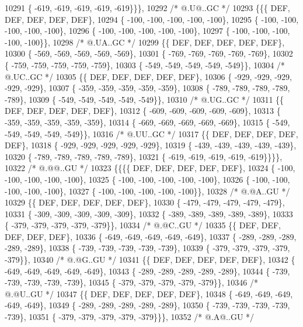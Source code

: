 \begin{DoxyCode}
10291 \{ -619, -619, -619, -619, -619\}\}\},
10292 \textcolor{comment}{/*  @.U@..GC */}
10293 \{\{\{  DEF,  DEF,  DEF,  DEF,  DEF\},
10294 \{ -100, -100, -100, -100, -100\},
10295 \{ -100, -100, -100, -100, -100\},
10296 \{ -100, -100, -100, -100, -100\},
10297 \{ -100, -100, -100, -100, -100\}\},
10298 \textcolor{comment}{/*  @.UA..GC */}
10299 \{\{  DEF,  DEF,  DEF,  DEF,  DEF\},
10300 \{ -569, -569, -569, -569, -569\},
10301 \{ -769, -769, -769, -769, -769\},
10302 \{ -759, -759, -759, -759, -759\},
10303 \{ -549, -549, -549, -549, -549\}\},
10304 \textcolor{comment}{/*  @.UC..GC */}
10305 \{\{  DEF,  DEF,  DEF,  DEF,  DEF\},
10306 \{ -929, -929, -929, -929, -929\},
10307 \{ -359, -359, -359, -359, -359\},
10308 \{ -789, -789, -789, -789, -789\},
10309 \{ -549, -549, -549, -549, -549\}\},
10310 \textcolor{comment}{/*  @.UG..GC */}
10311 \{\{  DEF,  DEF,  DEF,  DEF,  DEF\},
10312 \{ -609, -609, -609, -609, -609\},
10313 \{ -359, -359, -359, -359, -359\},
10314 \{ -669, -669, -669, -669, -669\},
10315 \{ -549, -549, -549, -549, -549\}\},
10316 \textcolor{comment}{/*  @.UU..GC */}
10317 \{\{  DEF,  DEF,  DEF,  DEF,  DEF\},
10318 \{ -929, -929, -929, -929, -929\},
10319 \{ -439, -439, -439, -439, -439\},
10320 \{ -789, -789, -789, -789, -789\},
10321 \{ -619, -619, -619, -619, -619\}\}\}\},
10322 \textcolor{comment}{/*  @.@@..GU */}
10323 \{\{\{\{  DEF,  DEF,  DEF,  DEF,  DEF\},
10324 \{ -100, -100, -100, -100, -100\},
10325 \{ -100, -100, -100, -100, -100\},
10326 \{ -100, -100, -100, -100, -100\},
10327 \{ -100, -100, -100, -100, -100\}\},
10328 \textcolor{comment}{/*  @.@A..GU */}
10329 \{\{  DEF,  DEF,  DEF,  DEF,  DEF\},
10330 \{ -479, -479, -479, -479, -479\},
10331 \{ -309, -309, -309, -309, -309\},
10332 \{ -389, -389, -389, -389, -389\},
10333 \{ -379, -379, -379, -379, -379\}\},
10334 \textcolor{comment}{/*  @.@C..GU */}
10335 \{\{  DEF,  DEF,  DEF,  DEF,  DEF\},
10336 \{ -649, -649, -649, -649, -649\},
10337 \{ -289, -289, -289, -289, -289\},
10338 \{ -739, -739, -739, -739, -739\},
10339 \{ -379, -379, -379, -379, -379\}\},
10340 \textcolor{comment}{/*  @.@G..GU */}
10341 \{\{  DEF,  DEF,  DEF,  DEF,  DEF\},
10342 \{ -649, -649, -649, -649, -649\},
10343 \{ -289, -289, -289, -289, -289\},
10344 \{ -739, -739, -739, -739, -739\},
10345 \{ -379, -379, -379, -379, -379\}\},
10346 \textcolor{comment}{/*  @.@U..GU */}
10347 \{\{  DEF,  DEF,  DEF,  DEF,  DEF\},
10348 \{ -649, -649, -649, -649, -649\},
10349 \{ -289, -289, -289, -289, -289\},
10350 \{ -739, -739, -739, -739, -739\},
10351 \{ -379, -379, -379, -379, -379\}\}\},
10352 \textcolor{comment}{/*  @.A@..GU */}

\end{DoxyCode}
